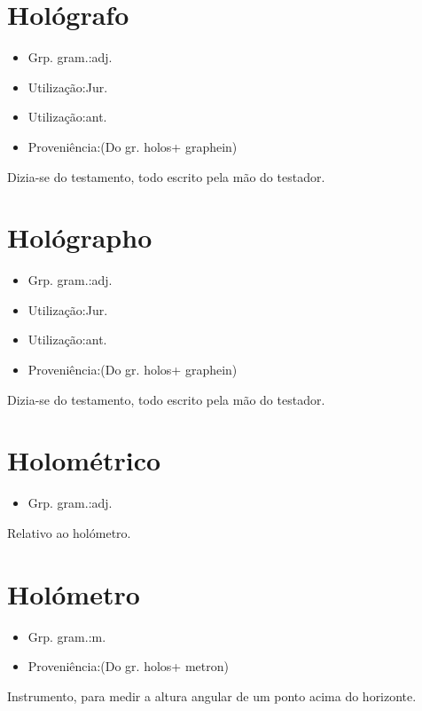 \documentclass{article}
\begin{document}
\section{Hológrafo}
\begin{itemize}
\item {Grp. gram.:adj.}
\end{itemize}
\begin{itemize}
\item {Utilização:Jur.}
\end{itemize}
\begin{itemize}
\item {Utilização:ant.}
\end{itemize}
\begin{itemize}
\item {Proveniência:(Do gr. \textunderscore holos\textunderscore  + \textunderscore graphein\textunderscore )}
\end{itemize}
Dizia-se do testamento, todo escrito pela mão do testador.
\section{Hológrapho}
\begin{itemize}
\item {Grp. gram.:adj.}
\end{itemize}
\begin{itemize}
\item {Utilização:Jur.}
\end{itemize}
\begin{itemize}
\item {Utilização:ant.}
\end{itemize}
\begin{itemize}
\item {Proveniência:(Do gr. \textunderscore holos\textunderscore  + \textunderscore graphein\textunderscore )}
\end{itemize}
Dizia-se do testamento, todo escrito pela mão do testador.
\section{Holométrico}
\begin{itemize}
\item {Grp. gram.:adj.}
\end{itemize}
Relativo ao holómetro.
\section{Holómetro}
\begin{itemize}
\item {Grp. gram.:m.}
\end{itemize}
\begin{itemize}
\item {Proveniência:(Do gr. \textunderscore holos\textunderscore  + \textunderscore metron\textunderscore )}
\end{itemize}
Instrumento, para medir a altura angular de um ponto acima do horizonte.
\end{document}
